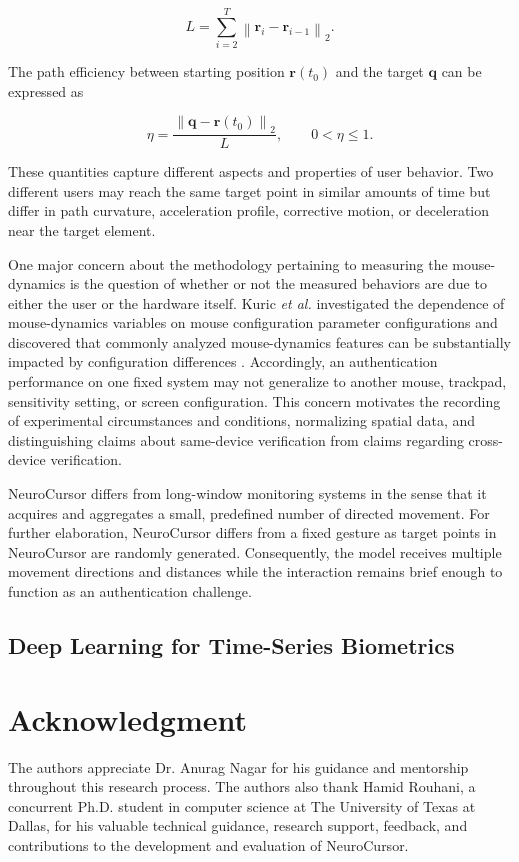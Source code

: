\documentclass[conference]{IEEEtran}
\begin{document}
\begin{equation}
L=
\sum_{i=2}^{T}
\left\|
\mathbf{r}_i-\mathbf{r}_{i-1}
\right\|_2.
\label{discrete_path_length}
\end{equation}

The path efficiency between starting position $\mathbf{r}(t_0)$ and the target $\mathbf{q}$ can be expressed as 

\begin{equation}
\eta
=
\frac{
\left\|
\mathbf{q}-\mathbf{r}(t_0)
\right\|_2
}{
L
},
\qquad
0 < \eta \leq 1.
\label{eq:path_efficiency}
\end{equation}

These quantities capture different aspects and properties of user behavior. Two different users may reach the same target point in similar amounts of time but differ in path curvature, acceleration profile, corrective motion, or deceleration near the target element. 

One major concern about the methodology pertaining to measuring the mouse-dynamics is the question of whether or not the measured behaviors are due to either the user or the hardware itself. Kuric \textit{et al.} investigated the dependence of mouse-dynamics variables on mouse configuration parameter configurations and discovered that commonly analyzed mouse-dynamics features can be substantially impacted by configuration differences \cite{kuricMouseCredibility}. Accordingly, an authentication performance on one fixed system may not generalize to another mouse, trackpad, sensitivity setting, or screen configuration. This concern motivates the recording of experimental circumstances and conditions, normalizing spatial data, and distinguishing claims about same-device verification from claims regarding cross-device verification. 

NeuroCursor differs from long-window monitoring systems in the sense that it acquires and aggregates a small, predefined number of directed movement. For further elaboration, NeuroCursor differs from a fixed gesture as target points in NeuroCursor are randomly generated. Consequently, the model receives multiple movement directions and distances while the interaction remains brief enough to function as an authentication challenge. 

\subsection{Deep Learning for Time-Series Biometrics}

\section*{Acknowledgment}
The authors appreciate Dr. Anurag Nagar for his guidance and mentorship throughout this research process. The authors also thank Hamid Rouhani, a concurrent Ph.D. student in computer science at The University of Texas at Dallas, for his valuable technical guidance, research support, feedback, and contributions to the development and evaluation of NeuroCursor. 
\end{document}
